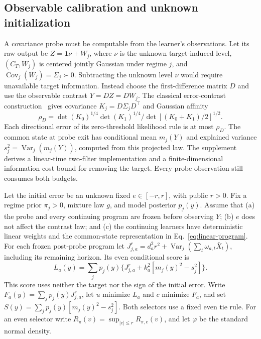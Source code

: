 \subsection{Observable calibration and unknown initialization}
A covariance probe must be computable from the learner's observations.
Let its raw output be $Z=\boldsymbol1\nu+W_j$, where $\nu$ is the unknown target-induced level, $(C_T,W_j)$ is centered jointly Gaussian under regime $j$, and $\operatorname{Cov}_j(W_j)=\Sigma_j\succ0$.
Subtracting the unknown level $\nu$ would require unavailable target information.
Instead choose the first-difference matrix $D$ and use the observable contrast $Y=DZ=DW_j$.
The classical error-contrast construction~\cite{harville1974contrasts} gives covariance $K_j=D\Sigma_jD^\top$ and Gaussian affinity
\[
\rho_D=\det(K_0)^{1/4}\det(K_1)^{1/4}/\det[(K_0+K_1)/2]^{1/2}.
\]
Each directional error of its zero-threshold likelihood rule is at most $\rho_D$.
The common state at probe exit has conditional mean $m_j(Y)$ and explained variance $s_j^2=\operatorname{Var}_j(m_j(Y))$, computed from this projected law.
The supplement derives a linear-time two-filter implementation and a finite-dimensional information-cost bound for removing the target.
Every probe observation still consumes both budgets.

Let the initial error be an unknown fixed $e\in[-r,r]$, with public $r>0$.
Fix a regime prior $\pi_j>0$, mixture law $g$, and model posterior $p_j(y)$.
Assume that (a) the probe and every continuing program are frozen before observing $Y$; (b) $e$ does not affect the contrast law; and (c) the continuing learners have deterministic linear weights and the common-state representation in Eq.~\eqref{eq:linear-program}.
For each frozen post-probe program let $J_{j,a}^{r}=d_a^2r^2+\operatorname{Var}_j(\sum_t\omega_{a,t}\bar X_t)$, including its remaining horizon.
Its even conditional score is
\begin{equation}
L_a(y)=\sum_jp_j(y)\{J_{j,a}^{r}+k_a^2[m_j(y)^2-s_j^2]\}.
\label{eq:conditional-even-score}
\end{equation}
This score uses neither the target nor the sign of the initial error.
Write $F_a(y)=\sum_jp_j(y)J_{j,a}^{r}$, let $u$ minimize $L_a$ and $c$ minimize $F_a$, and set $S(y)=\sum_jp_j(y)[m_j(y)^2-s_j^2]$.
Both selectors use a fixed even tie rule.
For an even selector write $R_\pi(v)=\sup_{|e|\le r}R_{\pi,e}(v)$, and let $\varphi$ be the standard normal density.

